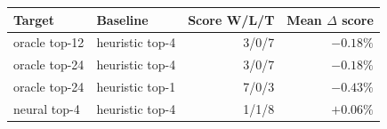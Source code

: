 \begin{tabular}{llrr}
\toprule
Target & Baseline & Score W/L/T & Mean $\Delta$ score \\
\midrule
oracle top-12 & heuristic top-4 & 3/0/7 & $-0.18\%$ \\
oracle top-24 & heuristic top-4 & 3/0/7 & $-0.18\%$ \\
oracle top-24 & heuristic top-1 & 7/0/3 & $-0.43\%$ \\
neural top-4 & heuristic top-4 & 1/1/8 & $+0.06\%$ \\
\bottomrule
\end{tabular}
